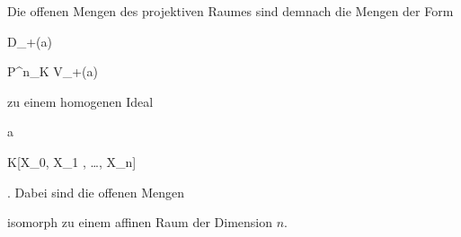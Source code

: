 Die offenen Mengen des projektiven Raumes sind demnach die Mengen der Form


\mavergleichskette

{\vergleichskette

{ D_+({\mathfrak a})
}

{  }{ {\mathbb P}^{n}_{K}  \setminus V_+({\mathfrak a})
}

{  }{
}

{    }{
}

{   }{
}

}
{}{}{}
zu einem homogenen Ideal


\mavergleichskette

{\vergleichskette

{ {\mathfrak a}
}

{ \subseteq }{  K[X_0, X_1 , \ldots , X_n]
}

{  }{
}

{    }{
}

{   }{
}

}
{}{}{.}
Dabei sind die offenen Mengen

 isomorph zu einem affinen Raum der Dimension $n$.



{}

